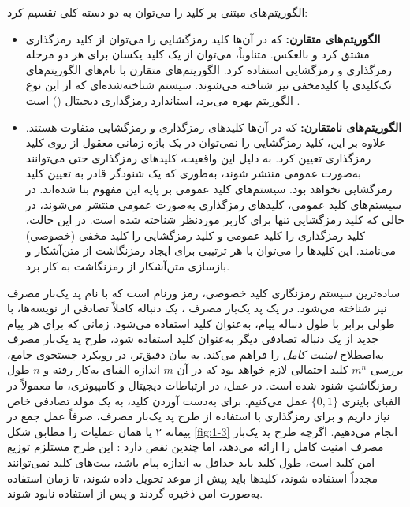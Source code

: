 الگوریتم‌های مبتنی بر کلید را می‌توان به دو دسته کلی تقسیم کرد:
\begin{itemize}
	\item \textbf{الگوریتم‌های متقارن:} که در آن‌ها کلید رمزگشایی را می‌توان از کلید رمزگذاری مشتق کرد و بالعکس. متناوباً، می‌توان از یک کلید یکسان برای هر دو مرحله رمزگذاری و رمزگشایی استفاده کرد. الگوریتم‌های متقارن با نام‌های الگوریتم‌های تک‌کلیدی یا کلید‌مخفی نیز شناخته می‌شوند. سیستم شناخته‌شده‌ای که از این نوع الگوریتم بهره می‌برد، استاندارد رمزگذاری دیجیتال () است \cite{1-13, 1-14, 1-15, 1-16, 1-17, 1-18}.
	\item \textbf{الگوریتم‌های نامتقارن:} که در آن‌ها کلیدهای رمزگذاری و رمزگشایی متفاوت هستند. علاوه بر این، کلید رمزگشایی را نمی‌توان در یک بازه زمانی معقول از روی کلید رمزگذاری تعیین کرد. به دلیل این واقعیت، کلیدهای رمزگذاری حتی می‌توانند به‌صورت عمومی منتشر شوند، به‌طوری که یک شنودگر قادر به تعیین کلید رمزگشایی نخواهد بود. سیستم‌های کلید عمومی \cite{1-17} بر پایه این مفهوم بنا شده‌اند. در سیستم‌های کلید عمومی، کلیدهای رمزگذاری به‌صورت عمومی منتشر می‌شوند، در حالی که کلید رمزگشایی تنها برای کاربر موردنظر شناخته شده است. در این حالت، کلید رمزگذاری را کلید عمومی و کلید رمزگشایی را کلید مخفی (خصوصی) می‌نامند. این کلیدها را می‌توان با هر ترتیبی برای ایجاد رمزنگاشت از متن‌آشکار و بازسازی متن‌آشکار از رمزنگاشت به کار برد.
\end{itemize}

ساده‌ترین سیستم رمزنگاری کلید خصوصی، رمز ورنام است که با نام پد یک‌بار مصرف نیز شناخته می‌شود. در یک پد یک‌بار مصرف \cite{1-23}، یک دنباله کاملاً تصادفی از نویسه‌ها، با طولی برابر با طول دنباله پیام، به‌عنوان کلید استفاده می‌شود. زمانی که برای هر پیام جدید از یک دنباله تصادفی دیگر به‌عنوان کلید استفاده شود، طرح پد یک‌بار مصرف به‌اصطلاح \textit{امنیت کامل} را فراهم می‌کند. به بیان دقیق‌تر، در رویکرد جستجوی جامع، بررسی $m^n$ کلید احتمالی لازم خواهد بود که در آن $m$ اندازه الفبای به‌کار رفته و $n$ طول رمزنگاشتِ شنود شده است. در عمل، در ارتباطات دیجیتال و کامپیوتری، ما معمولاً در الفبای باینری $\{0, 1\}$ عمل می‌کنیم. برای به‌دست آوردن کلید، به یک مولد تصادفی خاص نیاز داریم و برای رمزگذاری با استفاده از طرح پد یک‌بار مصرف، صرفاً عمل جمع در پیمانه ۲ یا همان عملیات  را مطابق شکل \ref{fig:1-3} انجام می‌دهیم. اگرچه طرح پد یک‌بار مصرف امنیت کامل را ارائه می‌دهد، اما چندین نقص دارد \cite{1-9, 1-10, 1-11}: این طرح مستلزم توزیع امن کلید است، طول کلید باید حداقل به اندازه پیام باشد، بیت‌های کلید نمی‌توانند مجدداً استفاده شوند، کلیدها باید پیش از موعد تحویل داده شوند، تا زمان استفاده به‌صورت امن ذخیره گردند و پس از استفاده نابود شوند.

